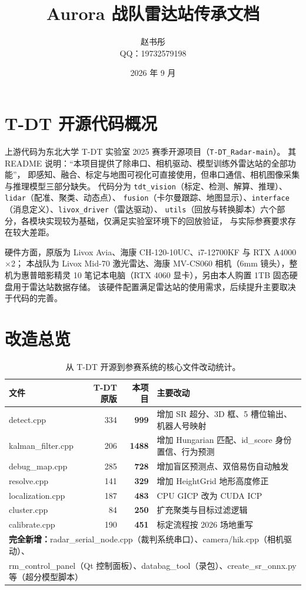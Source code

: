 \documentclass[11pt,a4paper,fontset=none]{ctexart}
\title{\heiti\textbf{Aurora 战队雷达站传承文档}}
\author{赵书彤 \\[2pt] \small QQ：19732579198}
\date{2026 年 9 月}
\newcommand{\code}[1]{\texttt{#1}}
\begin{document}
\maketitle

\tableofcontents

\section{T-DT 开源代码概况}

上游代码为东北大学 T-DT 实验室 2025 赛季开源项目（\code{T-DT\_Radar-main}）。
其 README 说明：``本项目提供了除串口、相机驱动、模型训练外雷达站的全部功能''，
即感知、融合、标定与地图可视化可直接使用，但串口通信、相机图像采集与推理模型三部分缺失。
代码分为 \code{tdt\_vision}（标定、检测、解算、推理）、\code{lidar}（配准、聚类、动态点）、
\code{fusion}（卡尔曼跟踪、地图显示）、\code{interface}（消息定义）、\code{livox\_driver}（雷达驱动）、
\code{utils}（回放与转换脚本）六个部分，各模块实现较为基础，仅满足实验室环境下的回放验证，
与实际参赛要求存在较大差距。

硬件方面，原版为 Livox Avia、海康 CH-120-10UC、i7-12700KF 与 RTX A4000$\times$2；
本战队为 Livox Mid-70 激光雷达、海康 MV-CS060 相机（6mm 镜头），整机为惠普暗影精灵 10
笔记本电脑（RTX 4060 显卡），另由本人购置 1TB 固态硬盘用于雷达站数据存储。
该硬件配置满足雷达站的使用需求，后续提升主要取决于代码的完善。

\section{改造总览}

\begin{table}[H]
\centering\small
\begin{tabularx}{\textwidth}{lrrX}
\toprule
文件 & T-DT 原版 & 本项目 & 主要改动 \\
\midrule
detect.cpp & 334 & \textbf{999} & 增加 SR 超分、3D 框、5 槽位输出、机器人号映射 \\
kalman\_filter.cpp & 206 & \textbf{1488} & 增加 Hungarian 匹配、id\_score 身份置信、行为预测 \\
debug\_map.cpp & 285 & \textbf{728} & 增加盲区预测点、双倍易伤自动触发 \\
resolve.cpp & 141 & \textbf{329} & 增加 HeightGrid 地形高度修正 \\
localization.cpp & 187 & \textbf{483} & CPU GICP 改为 CUDA ICP \\
cluster.cpp & 84 & \textbf{250} & 扩充聚类与目标过滤逻辑 \\
calibrate.cpp & 190 & \textbf{451} & 标定流程按 2026 场地重写 \\
\midrule
\multicolumn{4}{l}{\textbf{完全新增：}radar\_serial\_node.cpp（裁判系统串口）、camera/hik.cpp（相机驱动）、}\\
\multicolumn{4}{l}{rm\_control\_panel（Qt 控制面板）、databag\_tool（录包）、create\_sr\_onnx.py 等（超分模型脚本）}\\
\bottomrule
\end{tabularx}
\caption{从 T-DT 开源到参赛系统的核心文件改动统计。}
\end{table}
\end{document}

